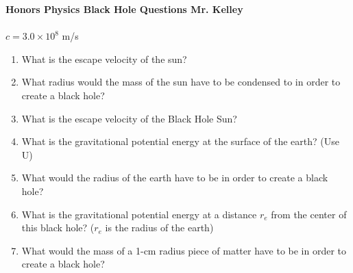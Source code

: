 \documentclass[12pt]{report}
\begin{document}
{\bf{Honors Physics} \hfill Black Hole Questions \hfill {Mr. Kelley}} \\ \\
\mbox{} \hfill $c = 3.0 \times 10^8$ m/s \hfill \mbox{}
\begin{enumerate}
\item What is the escape velocity of the sun?
\item What radius would the mass of the sun have to be condensed to in order to create a black hole?
\item What is the escape velocity of the Black Hole Sun?
\item What is the gravitational potential energy at the surface of the earth? (Use U)
\item What would the radius of the earth have to be in order to create a black hole?
\item What is the gravitational potential energy at a distance $r_e$ from the center of this black hole? ($r_e$ is the radius of the earth)
\item What would the mass of a 1-cm radius piece of matter have to be in order to create a black hole?
\end{enumerate}
\end{document}
